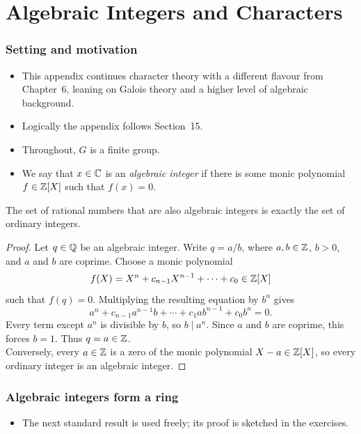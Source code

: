 \documentclass[../Odyssey_Project.tex]{subfiles}
\begin{document}
\setcounter{section}{16}
\section{Algebraic Integers and Characters}

\subsubsection*{Setting and motivation}
\begin{itemize}
    \item This appendix continues character theory with a different flavour from Chapter~6, leaning on Galois theory and a higher level of algebraic background.
    \item Logically the appendix follows Section~15.
    \item Throughout, $G$ is a finite group.
    \item We say that $x \in \mathbb{C}$ is an \emph{algebraic integer} if there is some monic polynomial $f \in \mathbb{Z}[X]$ such that $f(x) = 0$.
\end{itemize}

\begin{lemma}
\label{lem:17.1}
The set of rational numbers that are also algebraic integers is exactly the set of ordinary integers.
\end{lemma}
\begin{proof}
    Let $q\in\mathbb{Q}$ be an algebraic integer. Write $q=a/b$, where $a,b\in\mathbb{Z}$, $b>0$, and $a$ and $b$ are coprime. Choose a monic polynomial
    \[
        f(X)=X^n+c_{n-1}X^{n-1}+\cdots+c_0\in\mathbb{Z}[X]
    \]
    such that $f(q)=0$. Multiplying the resulting equation by $b^n$ gives
    \[
        a^n+c_{n-1}a^{n-1}b+\cdots+c_1ab^{n-1}+c_0b^n=0.
    \]
    Every term except $a^n$ is divisible by $b$, so $b\mid a^n$. Since $a$ and $b$ are coprime, this forces $b=1$. Thus $q=a\in\mathbb{Z}$.\\
    Conversely, every $a\in\mathbb{Z}$ is a zero of the monic polynomial $X-a\in\mathbb{Z}[X]$, so every ordinary integer is an algebraic integer.
\end{proof}

\subsubsection*{Algebraic integers form a ring}
\begin{itemize}
    \item The next standard result is used freely; its proof is sketched in the exercises.
\end{itemize}
\end{document}
